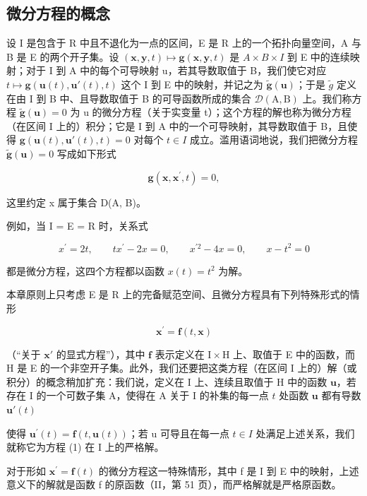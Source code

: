 \subsection{微分方程的概念}

设 I 是包含于 R 中且不退化为一点的区间，E 是 R 上的一个拓扑向量空间，A 与 B 是 E 的两个开子集。设 \((\mathbf{x}, \mathbf{y}, t) \mapsto \mathbf{g}(\mathbf{x}, \mathbf{y}, t)\) 是 \(A \times B \times I\) 到 E 中的连续映射；对于 I 到 A 中的每个可导映射 u，若其导数取值于 B，我们使它对应 \(t \mapsto \mathbf{g}(\mathbf{u}(t), \mathbf{u}'(t), t)\) 这个 I 到 E 中的映射，并记之为 \(\tilde{\mathbf{g}}(\mathbf{u})\)；于是 \(\tilde{g}\) 定义在由 I 到 B 中、且导数取值于 B 的可导函数所成的集合 \(\mathcal{D}(\mathrm{A}, \mathrm{B})\) 上。我们称方程 \(\tilde{\mathbf{g}}(\mathbf{u}) = 0\) 为 u 的微分方程（关于实变量 t）；这个方程的解也称为微分方程（在区间 I 上的）积分；它是 I 到 A 中的一个可导映射，其导数取值于 B，且使得 \(\mathbf{g}(\mathbf{u}(t), \mathbf{u}'(t), t) = 0\) 对每个 \(t \in I\) 成立。滥用语词地说，我们把微分方程 \(\tilde{\mathbf{g}}(\mathbf{u}) = 0\) 写成如下形式

\[
\mathbf {g} (\mathbf {x}, \mathbf {x} ^ {\prime}, t) = 0,
\]

这里约定 x 属于集合 D(A, B)。

例如，当 I = E = R 时，关系式

\[
x ^ {\prime} = 2 t, \qquad t x ^ {\prime} - 2 x = 0, \qquad x ^ {\prime 2} - 4 x = 0, \qquad x - t ^ {2} = 0
\]

都是微分方程，这四个方程都以函数 \(x(t) = t^{2}\) 为解。

本章原则上只考虑 E 是 R 上的完备赋范空间、且微分方程具有下列特殊形式的情形

\[
\mathbf {x} ^ {\prime} = \mathbf {f} (t, \mathbf {x})\tag{1}
\]

（“关于 \(\mathbf{x}'\) 的显式方程”），其中 \(\mathbf{f}\) 表示定义在 \(\mathrm{I} \times \mathrm{H}\) 上、取值于 E 中的函数，而 H 是 E 的一个非空开子集。此外，我们还要把这类方程（在区间 I 上的）解（或积分）的概念稍加扩充：我们说，定义在 I 上、连续且取值于 H 中的函数 \(\mathbf{u}\)，若存在 I 的一个可数子集 A，使得在 A 关于 I 的补集的每一点 \(t\) 处函数 \(\mathbf{u}\) 都有导数 \(\mathbf{u}'(t)\)

使得 \(\mathbf{u}^{\prime}(t)=\mathbf{f}(t,\mathbf{u}(t))\)；若 u 可导且在每一点 \(t\in I\) 处满足上述关系，我们就称它为方程 (1) 在 I 上的严格解。

对于形如 \(\mathbf{x}^{\prime}=\mathbf{f}(t)\) 的微分方程这一特殊情形，其中 f 是 I 到 E 中的映射，上述意义下的解就是函数 f 的原函数（II，第 51 页），而严格解就是严格原函数。

